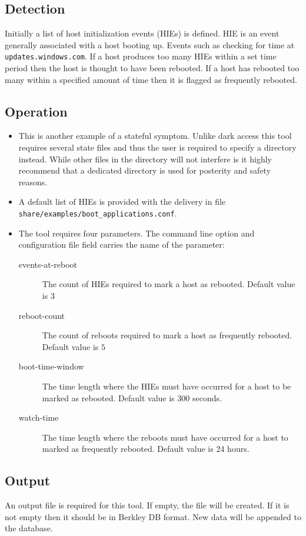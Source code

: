 \documentclass[titlepage,12pt]{report}
\begin{document}
\subsection{Detection}
Initially a list of host initialization events (HIEs) is defined. HIE is an event generally associated with a host booting up. Events such as checking for time at \verb|updates.windows.com|. If a host produces too many HIEs within a set time period then the host is thought to have been rebooted. If a host has rebooted too many within a specified amount of time then it is flagged as frequently rebooted.

\subsection{Operation}
\begin{itemize}
\item This is another example of a stateful symptom. Unlike dark access this tool requires several state files and thus the user is required to specify a directory instead. While other files in the directory will not interfere is it highly recommend that a dedicated directory is used for posterity and safety reasons.
\item A default list of HIEs is provided with the delivery in file \\ \texttt{share/examples/boot\_applications.conf}.
\item The tool requires four parameters. The command line option and configuration file field carries the name of the parameter:
	\begin{description}
	\item[events-at-reboot] The count of HIEs required to mark a host as rebooted. Default value is $3$
	\item[reboot-count] The count of reboots required to mark a host as frequently rebooted. Default value is $5$
	\item[boot-time-window] The time length where the HIEs must have occurred for a host to be marked as rebooted. Default value is $300$ seconds.
	\item[watch-time] The time length where the reboots must have occurred for a host to marked as frequently rebooted. Default value is 24 hours.
	\end{description}
\end{itemize}

\subsection{Output}
An output file is required for this tool. If empty, the file will be created. If it is not empty then it should be in Berkley DB format. New data will be appended to the database.
\end{document}
